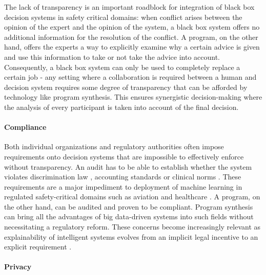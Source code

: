 The lack of transparency is an important roadblock for integration of black box decision systems in safety critical domains: when conflict arises between the opinion of the expert and the opinion of the system, a black box system offers no additional information for the resolution of the conflict. 
A program, on the other hand, offers the experts a way to explicitly examine why a certain advice is given and use this information to take or not take the advice into account. 
Consequently, a black box system can only be used to completely replace a certain job - any setting where a collaboration is required between a human and decision system requires some degree of transparency that can be afforded by technology like program synthesis. 
This ensures synergistic decision-making where the analysis of every participant is taken into account of the final decision.

\paragraph{Compliance}

Both individual organizations and regulatory authorities often impose requirements onto decision systems that are impossible to effectively enforce without transparency. 
An audit has to be able to establish whether the system violates discrimination law \cite{hochDiscriminationSakeFairness2024, schererApplyingOldRules2019}, accounting standards \cite{julischComplianceDesignBridging2011} or clinical norms \cite{flodgrenExternalInspectionCompliance}.
These requirements are a major impediment to deployment of machine learning in regulated safety-critical domains such as aviation \cite{torensGuidelinesRegulatoryFramework2021, vidotQualificationAvionicSoftware2024} and healthcare \cite{granlundRegulatoryCompliantMLOpsOravizio2021}.
A program, on the other hand, can be audited and proven to be compliant. 
Program synthesis can bring all the advantages of big data-driven systems into such fields without necessitating a regulatory reform.
These concerns become increasingly relevant as explainability of intelligent systems evolves from an implicit legal incentive \cite{hackerExplainableAIContract2020} to an explicit requirement \cite{linardatosExplainableAiReview2020}.

\paragraph{Privacy}

